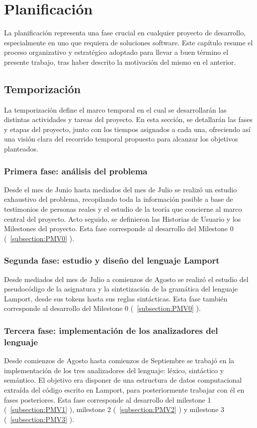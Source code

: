 \chapter{\textbf{Planificación}}
La planificación representa una fase crucial en cualquier proyecto de desarrollo, especialmente en uno que requiera de soluciones software. Este capítulo resume el proceso organizativo y estratégico adoptado para llevar a buen término el presente trabajo, tras haber descrito la motivación del mismo en el anterior.

\section{Temporización}
La temporización define el marco temporal en el cual se desarrollarán las distintas actividades y tareas del proyecto. En esta sección, se detallarán las fases y etapas del proyecto, junto con los tiempos asignados a cada una, ofreciendo así una visión clara del recorrido temporal propuesto para alcanzar los objetivos planteados.

\subsection{Primera fase: análisis del problema}
Desde el mes de Junio hasta mediados del mes de Julio se realizó un estudio exhaustivo del problema, recopilando toda la información posible a base de testimonios de personas reales y el estudio de la teoría que concierne al marco central del proyecto. Acto seguido, se definieron las Historias de Usuario y los Milestones del proyecto. Esta fase corresponde al desarrollo del Milestone 0 (~\ref{subsection:PMV0} ).

\subsection{Segunda fase: estudio y diseño del lenguaje Lamport}
Desde mediados del mes de Julio a comienzos de Agosto se realizó el estudio del pseudocódigo de la asignatura y la sintetización de la gramática del lenguaje Lamport, desde sus tokens hasta sus reglas sintácticas. Esta fase también corresponde al desarrollo del Milestone 0 (~\ref{subsection:PMV0} ).

\subsection{Tercera fase: implementación de los analizadores del lenguaje}
Desde comienzos de Agosto hasta comienzos de Septiembre se trabajó en la implementación de los tres analizadores del lenguaje: léxico, sintáctico y semántico. El objetivo era disponer de una estructura de datos computacional extraída del código escrito en Lamport, para posteriormente trabajar con él en fases posteriores. Esta fase corresponde al desarrollo del milestone 1 (~\ref{subsection:PMV1} ), milestone 2 (~\ref{subsection:PMV2} ) y milestone 3 (~\ref{subsection:PMV3} ).

